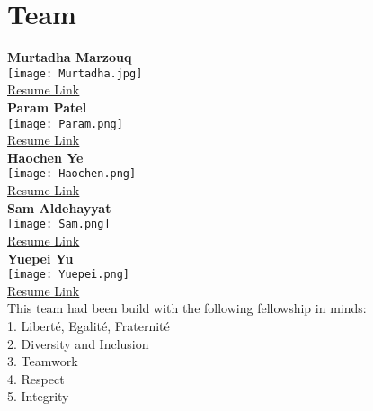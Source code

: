 \graphicspath{ {images} }

\section{Team}
\textbf{Murtadha Marzouq}\\   \texttt{[image: Murtadha.jpg]}\\  \href{https://webpages.charlotte.edu/mmarzouq/English/Resume.pdf}{\underline{Resume Link}}\\
    \textbf{Param Patel}\\ \texttt{[image: Param.png]}\\   \href{https://drive.google.com/file/d/13jr45PMGy9iJG0CavpYmuiN5SDwGgygj/view?usp=sharing}{\underline{Resume Link}}\\
    \textbf{Haochen Ye}\\ \texttt{[image: Haochen.png]}\\    \href{https://drive.google.com/file/d/1YOZvJANmngCAai1OxXm28a_7XmKGmpH1/view?usp=sharing}{\underline{Resume Link}}\\
    \textbf{Sam Aldehayyat}\\ \texttt{[image: Sam.png]}\\      \href{https://drive.google.com/file/d/14jBT5AZ_GzdElLh-0LSXzP7AxgjMu0wa/view?usp=sharing}{\underline{Resume Link}}\\
    \textbf{Yuepei Yu}\\ \texttt{[image: Yuepei.png]}\\      \href{https://drive.google.com/file/d/1xcBhl6kxY1gQZsCjADVlJvvDVYBJLoSo/view?usp=sharing}{\underline{Resume Link}}\\
This team had been build with the following fellowship in minds:\\
1. Liberté, Egalité, Fraternité\\
2. Diversity and Inclusion\\
3. Teamwork\\
4. Respect\\
5. Integrity\\

